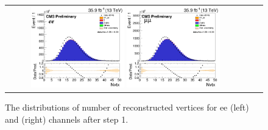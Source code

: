 \begin{figure}[ht]
  \begin{center}
    \begin{tabular}{ccc}
      \includegraphics[width=0.4\textwidth]{figures/tW/fig/Step1/ee_noNvtx/H_pv_n.png}
      \includegraphics[width=0.4\textwidth]{figures/tW/fig/Step1/mumu_noNvtx/H_pv_n.png}
    \end{tabular}
    \caption{The distributions of number of reconstructed vertices for ee (left) and \mumu (right) channels after step 1.
    \label{fig:step1_pv_n}}
  \end{center}
\end{figure}



